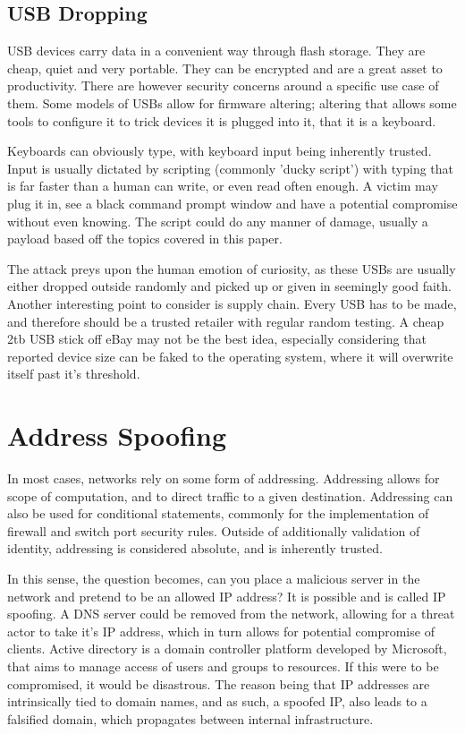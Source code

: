 \subsection{USB Dropping}
USB devices carry data in a convenient way through flash storage. They are cheap, quiet and very portable. They can be encrypted and are a great asset to productivity. 
There are however security concerns around a specific use case of them. Some models of USBs allow for firmware altering; altering that allows some tools to configure it to trick
devices it is plugged into it, that it is a keyboard. 

Keyboards can obviously type, with keyboard input being inherently trusted. Input is usually dictated by scripting (commonly 'ducky script')
with typing that is far faster than a human can write, or even read often enough. A victim may plug it in, see a black command prompt window and have a potential compromise without even knowing. 
The script could do any manner of damage, usually a payload based off the topics covered in this paper. 

The attack preys upon the human emotion of curiosity, as these USBs are usually either dropped outside randomly and picked up or given in seemingly good faith. Another interesting point to consider is supply chain.
Every USB has to be made, and therefore should be a trusted retailer with regular random testing. A cheap 2tb USB stick off eBay may not be the best idea, especially considering that reported device size can be faked to the operating system,
where it will overwrite itself past it's threshold.

\section{Address Spoofing}
In most cases, networks rely on some form of addressing. Addressing allows for scope of computation, and to direct traffic to a given destination. 
Addressing can also be used for conditional statements, commonly for the implementation of firewall and switch port security rules. Outside of additionally validation of identity, addressing
is considered absolute, and is inherently trusted. \citep{IPMACSpoofing}

In this sense, the question becomes, can you place a malicious server in the network and pretend to be an allowed IP address? It is possible and is called IP spoofing. A DNS server could be removed from the network, allowing for a threat actor to take it's IP address, 
which in turn allows for potential compromise of clients. Active directory is a domain controller platform developed by Microsoft, that aims to manage access of users and groups to resources. If this were to be compromised, it would be disastrous. 
The reason being that IP addresses are intrinsically tied to domain names, and as such, a spoofed IP, also leads to a falsified domain, which propagates between internal infrastructure. \citep{DNSSpoofing}

